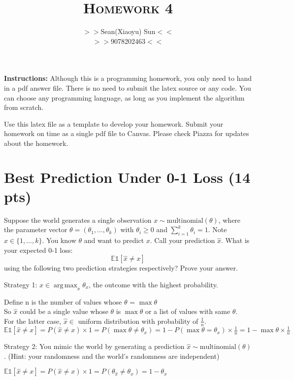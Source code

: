 \documentclass[a4paper]{article}
\title{\textsc{Homework 4}} %
\author{
$>>$Sean(Xiaoyu) Sun$<<$\\
$>>$9078202463$<<$\\
}
\date{}
\theoremstyle{definition}
\DeclareMathOperator*{\argmax}{arg\,max}
\def\E{\mathbb E}
\def\ind{\mathds 1}
\newenvironment{soln}{
    \leavevmode\color{blue}\ignorespaces
}{}
\begin{document}
\maketitle 


\textbf{Instructions:} 
Although this is a programming homework, you only need to hand in a pdf answer file.
There is no need to submit the latex source or any code.
You can choose any programming language, as long as you implement the algorithm from scratch. 

Use this latex file as a template to develop your homework.
Submit your homework on time as a single pdf file to Canvas.
Please check Piazza for updates about the homework.

\section{Best Prediction Under 0-1 Loss (14 pts)}
Suppose the world generates a single observation $x \sim \mbox{multinomial}(\theta)$, where the parameter vector $\theta=(\theta_1, \ldots, \theta_k)$ with $\theta_i\ge 0$ and $\sum_{i=1}^k \theta_i=1$.  Note $x \in \{1, \ldots, k\}$.
You know $\theta$ and want to predict $x$. 
Call your prediction $\hat x$.  What is your expected 0-1 loss: 
$$\E \ind[\hat x \neq x]$$
using the following two prediction strategies respectively?  Prove your answer.

Strategy 1: $\hat x \in \argmax_x \theta_x$, the outcome with the highest probability.

\begin{soln}
Define n is the number of values whose $\theta$ = $\max\theta$\\
So $\hat x$ could be a single value whose $\theta$ is $ \max\theta $ or a list of values with same $\theta$.\\
 For the latter case, $\hat x \in$ uniform distribution with probability of $\frac{1}{n}$.\\
$\E \ind[\hat x \neq x] = P(\hat x \neq x)\times1 = P(\max\theta \neq \theta_x) = 1 - P(\max\theta = \theta_x)\times \frac{1}{n} = 1 - \max\theta \times \frac{1}{n}$
\end{soln}

Strategy 2: You mimic the world by generating a prediction $\hat x \sim \mbox{multinomial}(\theta)$.  (Hint: your randomness and the world's randomness are independent)

\begin{soln}
$\E \ind[\hat x \neq x] = P(\hat x \neq x)\times1 = P(\theta_{\hat x} \neq \theta_x) = 1 - \theta_{x}$
\end{soln}
\end{document}
